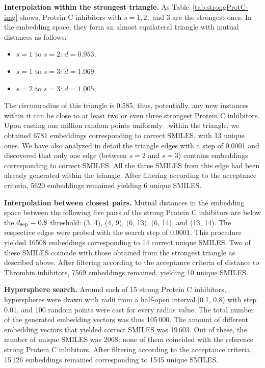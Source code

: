 \documentclass[12pt]{article}
\begin{document}
\textbf{Interpolation within the strongest triangle.}
As Table~\ref{tab:strongProtC-img} shows, Protein C inhibitors with $s=1, 2,$ and 3 are the strongest ones.
In the embedding space, they form an almost equilateral triangle with mutual distances as follows:
\begin{itemize}
    \item $s=1$ to $s=2$: $d = 0.953$,
    \item $s=1$ to $s=3$: $d = 1.069$.
    \item $s=2$ to $s=3$: $d = 1.005$,
\end{itemize}
The circumradius of this triangle is 0.585, thus, potentially, any new instances within it can be close to at least two or even three strongest Protein C inhibitors.
Upon casting one million random points uniformly~\cite{Osada2002} within the triangle, we obtained 6781 embeddings corresponding to correct SMILES, with 13 unique ones.
We have also analyzed in detail the triangle edges with a step of 0.0001 and discovered that only one edge (between $s=2$ and $s=3$) contains embeddings corresponding to correct SMILES.
All the three SMILES from this edge had been already generated within the triangle.
After filtering according to the acceptance criteria, 5620 embeddings remained yielding 6 unique SMILES.


\textbf{Interpolation between closest pairs.}
Mutual distances in the embedding space between the following five pairs of the strong Protein C inhibitors are below the $d_{\rm sep} = 0.8$ threshold:
(3, 4), (4, 9), (6, 13), (6, 14), and (13, 14).
The respective edges were probed with the search step of 0.0001.
This procedure yielded 16508 embeddings corresponding to 14 correct unique SMILES.
Two of these SMILES coincide with those obtained from the strongest triangle as described above.
After filtering according to the acceptance criteria of distance to Thrombin inhibitors, 7569 embeddings remained, yielding 10 unique SMILES.


\textbf{Hypersphere search.}
Around each of 15 strong Protein C inhibitors, hyperspheres were drawn with radii from a half-open interval [0.1, 0.8) with step 0.01, and 100 random points were cast for every radius value. 
The total number of the generated embedding vectors was thus 105\,000. 
The amount of different embedding vectors that yielded correct SMILES was 19\,603.
Out of these, the number of unique SMILES was 2068; none of them coincided with the reference strong Protein C inhibitors.
After filtering according to the acceptance criteria, 15\,126 embeddings remained corresponding to 1545 unique SMILES.
\end{document}
